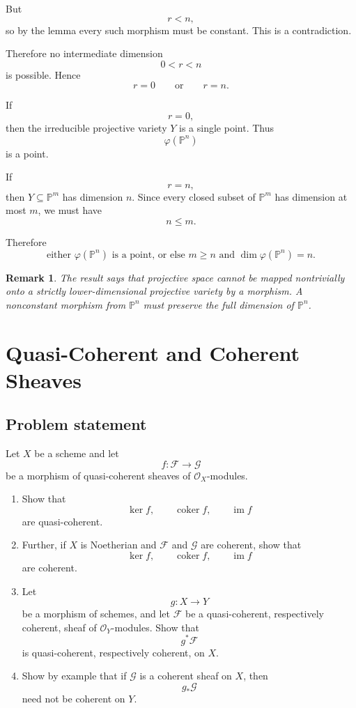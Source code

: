 \documentclass[12pt,a4paper]{article}
\DeclareMathOperator{\im}{im}
\DeclareMathOperator{\coker}{coker}
\newcommand{\OO}{\mathcal{O}}
\providecommand{\Pj}{\mathbb P}
\theoremstyle{notespace}
\newtheorem{remark}[definition]{Remark}
\begin{document}
But
\[
r<n,
\]
so by the lemma every such morphism must be constant. This is a contradiction.

Therefore no intermediate dimension
\[
0<r<n
\]
is possible. Hence
\[
r=0
\qquad\text{or}\qquad
r=n.
\]

If
\[
r=0,
\]
then the irreducible projective variety \(Y\) is a single point. Thus
\[
\varphi(\Pj^n)
\]
is a point.

If
\[
r=n,
\]
then \(Y\subseteq \Pj^m\) has dimension \(n\). Since every closed subset of \(\Pj^m\) has dimension at most \(m\), we must have
\[
n\leq m.
\]

Therefore
\[
\boxed{
	\text{either }\varphi(\Pj^n)\text{ is a point, or else }
	m\geq n
	\text{ and }
	\dim\varphi(\Pj^n)=n.
}
\]

\begin{remark}
	The result says that projective space cannot be mapped nontrivially onto a strictly lower-dimensional projective variety by a morphism. A nonconstant morphism from \(\Pj^n\) must preserve the full dimension of \(\Pj^n\).
\end{remark}

\section{Quasi-Coherent and Coherent Sheaves}

\subsection*{Problem statement}

Let \(X\) be a scheme and let
\[
f:\mathcal{F}\longrightarrow \mathcal{G}
\]
be a morphism of quasi-coherent sheaves of \(\OO_X\)-modules.

\begin{enumerate}[label=(\alph*)]
	\item Show that
	\[
	\ker f,\qquad \coker f,\qquad \im f
	\]
	are quasi-coherent.
	
	\item Further, if \(X\) is Noetherian and \(\mathcal{F}\) and \(\mathcal{G}\) are coherent, show that
	\[
	\ker f,\qquad \coker f,\qquad \im f
	\]
	are coherent.
	
	\item Let
	\[
	g:X\longrightarrow Y
	\]
	be a morphism of schemes, and let \(\mathcal{F}\) be a quasi-coherent, respectively coherent, sheaf of \(\OO_Y\)-modules. Show that
	\[
	g^*\mathcal{F}
	\]
	is quasi-coherent, respectively coherent, on \(X\).
	
	\item Show by example that if \(\mathcal{G}\) is a coherent sheaf on \(X\), then
	\[
	g_*\mathcal{G}
	\]
	need not be coherent on \(Y\).
\end{enumerate}
\end{document}
